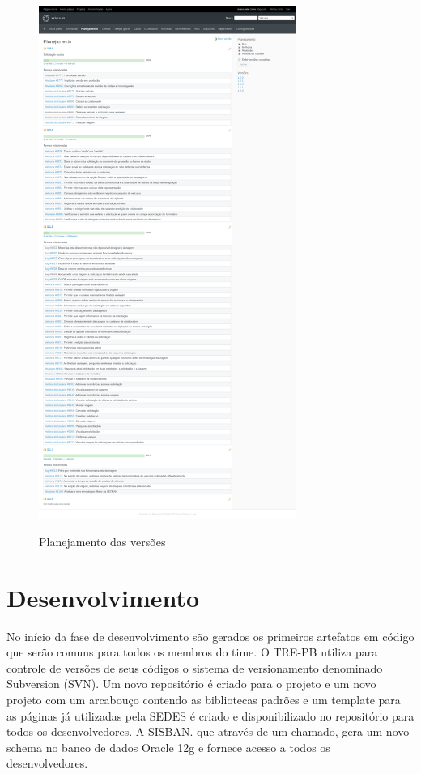 \begin{figure}[!htb]
    \centering
    \caption{Planejamento das versões}
    \includegraphics[width=0.75\textwidth]{dados/figuras/veiculos-planejamento.png}
    \label{fig:figura-planejamento}
\end{figure}

\section{Desenvolvimento}
\label{sec:atividadesRealizadasDesenvolvimento}

No início da fase de desenvolvimento são gerados os primeiros artefatos em código que serão comuns para todos os membros do time. O TRE-PB utiliza para controle de versões de seus códigos o sistema de versionamento denominado Subversion (SVN). Um novo repositório é criado para o projeto e um novo projeto com um arcabouço contendo as bibliotecas padrões e um template para as páginas já utilizadas pela SEDES é criado e disponibilizado no repositório para todos os desenvolvedores. A SISBAN. que através de um chamado, gera um novo schema no banco de dados Oracle 12g e fornece acesso a todos os desenvolvedores.

